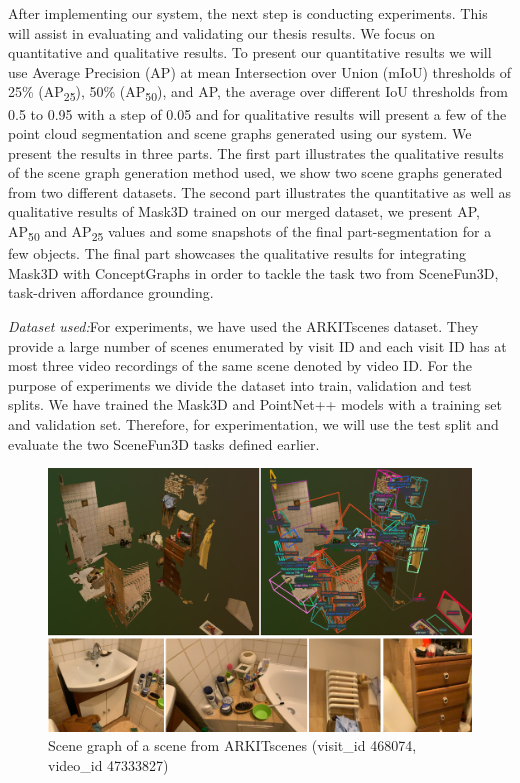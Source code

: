 After implementing our system, the next step is conducting experiments. This will assist in evaluating and validating our thesis results.
We focus on quantitative and qualitative results. To present our quantitative results we will use Average Precision (AP) at mean Intersection over Union (mIoU) thresholds of 
25\% (AP\textsubscript{25}), 50\% (AP\textsubscript{50}), and AP,  the average over
different IoU thresholds from 0.5 to 0.95 with a step of 0.05 and for qualitative results will present a few of the point cloud segmentation and scene graphs generated using our system. We present the results in 
three parts. The first part illustrates the qualitative results of the scene graph generation method used, we show two scene graphs generated from two different datasets.
The second part illustrates the quantitative as well as qualitative results of Mask3D trained on our merged dataset, we present AP, AP\textsubscript{50} and AP\textsubscript{25} values and some 
snapshots of the final part-segmentation for a few objects. The final part showcases the qualitative results for integrating Mask3D with ConceptGraphs in order to
tackle the task two from SceneFun3D, task-driven affordance grounding.

\textit{Dataset used:}For experiments, we have used the ARKITscenes dataset. They provide a large number of scenes enumerated by visit ID and each visit ID has at most three 
video recordings of the same scene denoted by video ID. For the purpose of experiments we divide the dataset into train, validation and test splits. We have trained
the Mask3D and PointNet++ models with a training set and validation set. Therefore, for experimentation, we will use the test split and evaluate the two SceneFun3D tasks defined 
earlier. 
\begin{figure}[ht!]
    \centering
    \includegraphics[width=\textwidth]{content/images/results/SF_SG.png}
    \caption{Scene graph of a scene from ARKITscenes (visit\_id 468074, video\_id 47333827)}
    \label{fig:result1}
\end{figure}
